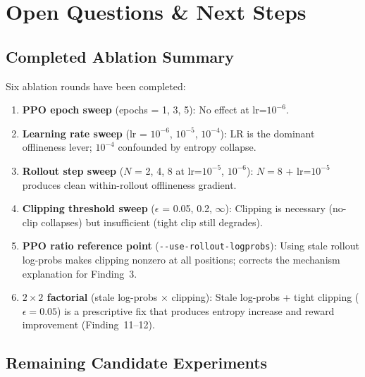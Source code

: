 \documentclass[11pt,a4paper]{article}
\begin{document}
\section{Open Questions \& Next Steps}
\label{sec:next}

\subsection{Completed Ablation Summary}

Six ablation rounds have been completed:
\begin{enumerate}[leftmargin=*]
  \item \textbf{PPO epoch sweep} (epochs = 1, 3, 5): No effect at lr=$10^{-6}$.
  \item \textbf{Learning rate sweep} (lr = $10^{-6}$, $10^{-5}$, $10^{-4}$):
    LR is the dominant offlineness lever; $10^{-4}$ confounded by entropy collapse.
  \item \textbf{Rollout step sweep} ($N$ = 2, 4, 8 at lr=$10^{-5}$, $10^{-6}$):
    $N = 8$ + lr=$10^{-5}$ produces clean within-rollout offlineness gradient.
  \item \textbf{Clipping threshold sweep} ($\epsilon$ = 0.05, 0.2, $\infty$):
    Clipping is necessary (no-clip collapses) but insufficient (tight clip
    still degrades).
  \item \textbf{PPO ratio reference point} (\texttt{-{}-use-rollout-logprobs}):
    Using stale rollout log-probs makes clipping nonzero at all positions;
    corrects the mechanism explanation for Finding~3.
  \item \textbf{$2 \times 2$ factorial} (stale log-probs $\times$ clipping):
    Stale log-probs + tight clipping ($\epsilon = 0.05$) is a prescriptive fix
    that produces entropy increase and reward improvement (Finding~11--12).
\end{enumerate}

\subsection{Remaining Candidate Experiments}
\end{document}
